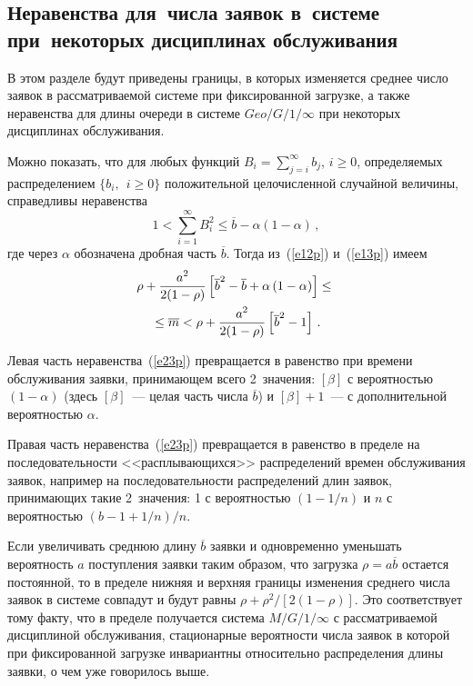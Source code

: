 \begin{multicols}{2}
\section{Неравенства для~числа заявок в~системе
при~некоторых дисциплинах обслуживания}

В этом разделе будут приведены границы, в которых изменяется
среднее число заявок в рас\-смат\-ри\-ва\-емой системе при фиксированной
загрузке, а также неравенства для длины очереди в системе
$Geo/G/1/\infty$ при некоторых дисциплинах обслуживания.

Можно показать, что для любых функций
$B_i=\sum_{j=i}^\infty b_j$, $i\ge0$,
определяемых распределением $\{b_i,\ \ i\ge 0\}$
положительной целочисленной случайной величины, справедливы
неравенства
$$
1 < \sum_{i=1}^{\infty} B_i^2 \le \overline b - \alpha(1-\alpha)\,,
$$
где через $\alpha$ обозначена дробная часть $\overline b$.
Тогда из~(\ref{e12p}) и~(\ref{e13p}) имеем
\begin{multline}
\rho + \displaystyle\frac{\displaystyle a^2\mathstrut}{\displaystyle 2(1-\rho)\mathstrut} \left [ \overline b^2 -
\overline b + \alpha\left ( 1-\alpha\right ) \right ]
\le {}\\
{}\le
\overline m < \rho + \displaystyle\frac{\displaystyle a^2\mathstrut}{\displaystyle 2(1-\rho)\mathstrut}
\left [ \overline b^2 - 1\right ]\,.
\label{e23p}
\end{multline}

Левая часть неравенства~(\ref{e23p}) превращается в равенство при
времени обслуживания заявки, принимающем всего 2~значения:
$[\beta]$ с вероятностью $(1-\alpha)$ (здесь $[\beta]$~---
целая часть числа $\overline b$) и $[\beta]+1$~--- с дополнительной
вероятностью $\alpha$.

Правая часть неравенства~(\ref{e23p}) превращается в равенство в пределе
на последовательности <<расплывающихся>> распределений времен
обслуживания заявок,
например на последовательности распределений длин
заявок, принимающих такие 2~значения:
1 с вероятностью $(1-1/n)$ и
$n$ с вероятностью $(b-1+1/n)/n$.

Если увеличивать среднюю длину $\overline b$ заявки и
одновременно уменьшать вероятность $a$ поступления заявки
таким образом, что загрузка $\rho=a\overline b$ остается
постоянной, то в пределе нижняя и верхняя границы изменения
среднего числа заявок в системе совпадут и будут равны
$\rho + \rho^2 /\left [ 2 (1-\rho)\right ]$.
Это соответствует тому факту, что в пределе получается система
$M/G/1/\infty$ с рассматриваемой дисциплиной обслуживания,
стационарные вероятности чис\-ла заявок в которой при фиксированной
загрузке инвариантны относительно распределения длины заявки,
о чем уже говорилось выше.


\end{multicols}
